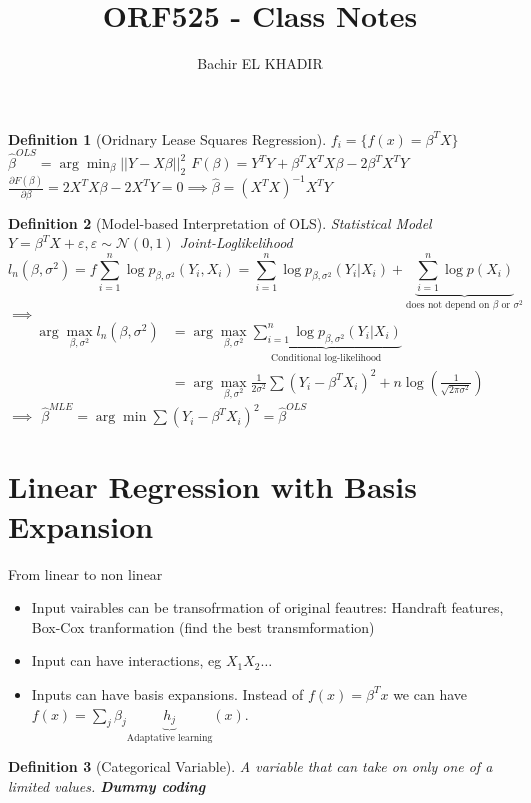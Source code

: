 \documentclass{article}
\title{ORF525 - Class Notes}
\author{Bachir EL KHADIR }
\newtheorem{definition}{Definition}
\begin{document}
\maketitle

\begin{definition}[Oridnary Lease Squares Regression]
$f_i = \{ f(x) = \beta^T X\}$
$\hat \beta^{OLS} = \arg \min_{\beta} ||Y - X \beta||_2^2$
$F(\beta) = Y^TY + \beta^TX^TX\beta - 2\beta^TX^TY$
$\frac{\partial F(\beta)}{\partial \beta} = 2X^TX\beta - 2X^TY = 0 \implies \hat \beta = (X^TX)^{-1}X^TY$
\end{definition}
\begin{definition}[Model-based Interpretation of OLS]
  Statistical Model $Y = \beta^TX + \varepsilon, \varepsilon \sim \mathcal N(0, 1)$
  Joint-Loglikelihood
  $$l_n(\beta, \sigma^2) =f \sum_{i=1}^n \log p_{\beta, \sigma^2}(Y_i, X_i) =  \sum_{i=1}^n \log p_{\beta, \sigma^2}(Y_i| X_i) + \underbrace{ \sum_{i=1}^n \log p(X_i) }_{\text{does not depend on $\beta$ or $\sigma^2$}}  $$
  $\implies$
  \begin{align*}
    \arg\max_{\beta, \sigma^2} l_n(\beta, \sigma^2)
    &= \arg\max_{\beta, \sigma^2}  \underbrace{\sum_{i=1}^n \log p_{\beta, \sigma^2}(Y_i| X_i)}_{\text{Conditional log-likelihood}}
    \\& = \arg\max_{\beta, \sigma^2} \frac1{2\sigma^2} \sum (Y_i - \beta^TX_i)^2 + n \log(\frac1{\sqrt{2\pi\sigma^2}})
  \end{align*}
  $\implies$
  $\hat \beta^{MLE} = \arg\min \sum (Y_i - \beta^T X_i)^2 = \hat \beta^{OLS}$
\end{definition}

\section{Linear Regression with Basis Expansion}
From linear to non linear
\begin{itemize}
\item Input vairables can be transofrmation of original feautres: Handraft features, Box-Cox tranformation (find the best transmformation)
\item Input can have interactions, eg $X_1X_2 \ldots$
\item Inputs can have basis expansions. Instead of $f(x) = \beta^Tx$ we can have $f(x) = \sum_j \beta_j \underbrace{h_j}_{\text{Adaptative learning}}(x)$.
\end{itemize}

\begin{definition} [Categorical Variable]
  A variable that can take on only one of a limited values.
  \textbf{Dummy coding}
\end{definition}
\end{document}
